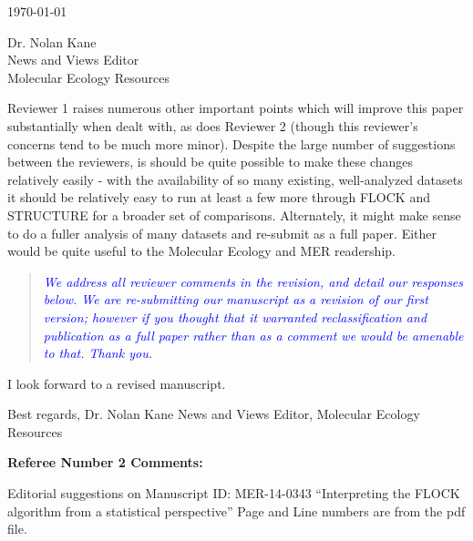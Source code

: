 \documentclass[11pt]{letter}
\newcommand{\reply}[1]{\begin{quotation}\small\sl\textcolor{blue}{#1}\end{quotation}}
\begin{document}
\begin{letter}{ \today 

Dr. Nolan Kane\\
News and Views Editor\\
Molecular Ecology Resources \\
}
Reviewer 1 raises numerous other important points which will improve this paper substantially when dealt with, as does Reviewer 2 (though this reviewer's concerns tend to be much more minor). Despite the large number of suggestions between the reviewers, is should be quite possible to make these changes relatively easily - with the availability of so many existing, well-analyzed datasets it should be relatively easy to run at least a few more through FLOCK and STRUCTURE for a broader set of comparisons.  Alternately, it might make sense to do a fuller analysis of many datasets and re-submit as a full paper. Either would be quite useful to the Molecular Ecology and MER readership.

\reply{We address all reviewer comments in the revision, and detail our responses below.  We are re-submitting
our manuscript as a revision of our first version; however if you thought that it warranted
reclassification and publication as
a full paper rather than as a comment we would be amenable to that.  Thank you.}

I look forward to a revised manuscript.

Best regards,
Dr. Nolan Kane
News and Views Editor, Molecular Ecology Resources



{\bf Referee Number 2 Comments:}

Editorial suggestions on Manuscript ID: MER-14-0343 ``Interpreting the FLOCK algorithm from a statistical perspective''
Page and Line numbers are from the pdf file.
\begin{itemize}


\end{itemize}
\end{letter}
\end{document}
